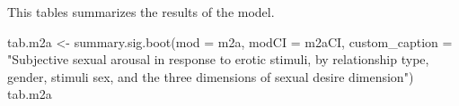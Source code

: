 \documentclass[
  bookmarksnumbered]{article}
\newenvironment{Shaded}{\begin{snugshade}}{\end{snugshade}}
\newcommand{\AttributeTok}[1]{\textcolor[rgb]{0.80,0.80,0.80}{#1}}
\newcommand{\FunctionTok}[1]{\textcolor[rgb]{0.94,0.94,0.56}{#1}}
\newcommand{\NormalTok}[1]{\textcolor[rgb]{0.80,0.80,0.80}{#1}}
\newcommand{\OtherTok}[1]{\textcolor[rgb]{0.94,0.94,0.56}{#1}}
\newcommand{\StringTok}[1]{\textcolor[rgb]{0.80,0.58,0.58}{#1}}
\begin{document}
This tables summarizes the results of the model.

\begin{Shaded}
\begin{Highlighting}[]
\NormalTok{tab.m2a }\OtherTok{\textless{}{-}} \FunctionTok{summary.sig.boot}\NormalTok{(}\AttributeTok{mod =}\NormalTok{ m2a,}
                            \AttributeTok{modCI =}\NormalTok{ m2aCI,}
                            \AttributeTok{custom\_caption =} \StringTok{"Subjective sexual arousal in response to erotic }
\StringTok{                            stimuli, by relationship type, gender, stimuli sex, and the three }
\StringTok{                            dimensions of sexual desire dimension"}\NormalTok{)}
\NormalTok{tab.m2a}
\end{Highlighting}
\end{Shaded}
\end{document}
